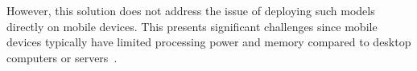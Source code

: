 \documentclass[licencjacka,en]{pracamgr}
\begin{document}
However, this solution does not address the issue of deploying such models directly on mobile devices. This presents significant challenges since mobile devices typically have limited processing power and memory compared to desktop computers or servers~\cite{mobile_resources}.




 
\end{document}
